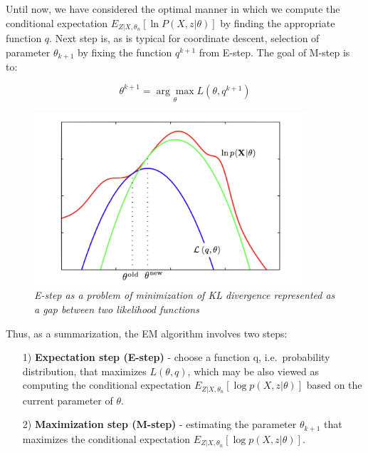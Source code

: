 Until now, we have considered the optimal manner in which we compute the conditional expectation $E_{Z|X,\theta_n} [\ln P(X,z|\theta)]$ by 
finding the appropriate function $q$. Next step is, as is typical for coordinate descent, selection of parameter $\theta_{k+1}$ by fixing 
the function $q^{k+1}$ from E-step. The goal of M-step is to:

\begin{equation}
\theta^{k+1} = \underset{\theta}{\arg\max} L(\theta, q^{k+1})
\end{equation}

\begin{figure}[ht]

\begin{center}
	\includegraphics[width=0.9\textwidth]{Figs/Loglike.png}
\end{center}

\caption{\textit{E-step as a problem of minimization of KL divergence represented as a gap between two likelihood functions}}
\label{fig:Loglike}
\end{figure}

\noindent Thus, as a summarization, the EM algorithm involves two steps:

\begin{itemize}
\item[1)] \textbf{Expectation step (E-step)} - choose a function q, i.e.\ probability distribution, that maximizes $L(\theta, q)$, which may be also viewed as computing the conditional expectation $E_{Z|X,\theta_n} [\log p(X,z|\theta)]$ based on the current parameter of $\theta$.
\item[2)] \textbf{Maximization step (M-step)} - estimating the parameter $\theta_{k+1}$ that maximizes the conditional expectation $E_{Z|X,\theta_n} [\log p(X,z|\theta)]$.
\end{itemize}

